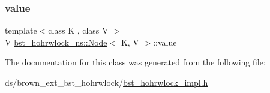 \subsubsection{\texorpdfstring{value}{value}}
{\footnotesize\ttfamily template$<$class K , class V $>$ \\
V \hyperlink{classbst__hohrwlock__ns_1_1Node}{bst\+\_\+hohrwlock\+\_\+ns\+::\+Node}$<$ K, V $>$\+::value}



The documentation for this class was generated from the following file\+:\begin{DoxyCompactItemize}
\item 
ds/brown\+\_\+ext\+\_\+bst\+\_\+hohrwlock/\hyperlink{bst__hohrwlock__impl_8h}{bst\+\_\+hohrwlock\+\_\+impl.\+h}\end{DoxyCompactItemize}
